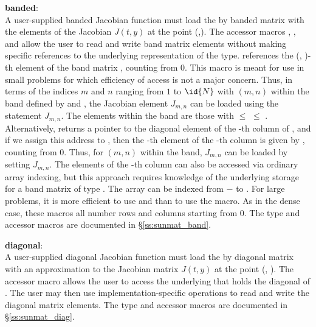 {  {\bf banded}:\\
  A user-supplied banded Jacobian function must load the  by  banded matrix
   with the elements of the Jacobian $J(t,y)$ at the point
  (,).  The accessor macros ,
  , and  allow the user
  to read and write band matrix elements without making specific
  references to the underlying representation of the {\sunmatband}
  type.   references the (,
  )-th element of the band matrix , counting from $0$.
  This macro is meant for use in small problems for which efficiency
  of access is not a major concern.  Thus, in terms of the indices $m$
  and $n$ ranging from $1$ to $\id{N}$ with $(m,n)$ within the band defined
  by  and , the Jacobian element $J_{m,n}$ can
  be loaded using the statement 
  $J_{m,n}$. The elements within the band are those with 
  $\le$  $\le$ . Alternatively,
   returns a pointer to the diagonal element
  of the -th column of , and if we assign this address
  to , then the -th element of the
  -th column is given by
  , counting from $0$.  Thus,
  for $(m,n)$ within the band, $J_{m,n}$ can be loaded by setting
   $J_{m,n}$.  The
  elements of the -th column can also be accessed via ordinary
  array indexing, but this approach requires knowledge of the
  underlying storage for a band matrix of type {\sunmatband}.   
  The array  can be indexed from $-$ to
  . For large problems, it is more efficient to use
   and  than to use the
   macro.  As in the dense case, these macros all
  number rows and columns starting from $0$.  The {\sunmatband} type
  and accessor macros are documented in \S\ref{ss:sunmat_band}.

  {\bf diagonal}:\\
  A user-supplied diagonal Jacobian function must load the  by
   diagonal matrix  with an approximation to the
  Jacobian matrix $J(t,y)$ at the point (, ).  The
  accessor macro  allows the user to access the
  underlying {\nvector} that holds the diagonal of .  The user
  may then use implementation-specific {\nvector} operations to read
  and write the diagonal matrix elements. The {\sunmatdiag} type
  and accessor macros are documented in \S\ref{ss:sunmat_diag}.

}
